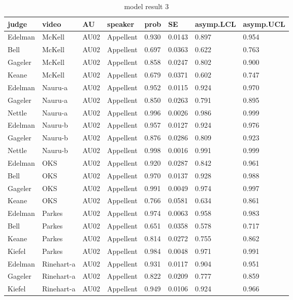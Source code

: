 \documentclass{monashthesis}
\begin{document}
\begin{center}
\begin{longtable}{llllllll}
\caption{\label{tab:result_3} model result 3}\\
\toprule
judge & video & AU & speaker & prob & SE & asymp.LCL & asymp.UCL \\
\midrule
\endhead
\bottomrule
\endfoot
Edelman & McKell & AU02 & Appellent & 0.930 & 0.0143 & 0.897 & 0.954 \\
Bell & McKell & AU02 & Appellent & 0.697 & 0.0363 & 0.622 & 0.763 \\
Gageler & McKell & AU02 & Appellent & 0.858 & 0.0247 & 0.802 & 0.900 \\
Keane & McKell & AU02 & Appellent & 0.679 & 0.0371 & 0.602 & 0.747 \\
Edelman & Nauru-a & AU02 & Appellent & 0.952 & 0.0115 & 0.924 & 0.970 \\
Gageler & Nauru-a & AU02 & Appellent & 0.850 & 0.0263 & 0.791 & 0.895 \\
Nettle & Nauru-a & AU02 & Appellent & 0.996 & 0.0026 & 0.986 & 0.999 \\
Edelman & Nauru-b & AU02 & Appellent & 0.957 & 0.0127 & 0.924 & 0.976 \\
Gageler & Nauru-b & AU02 & Appellent & 0.876 & 0.0286 & 0.809 & 0.923 \\
Nettle & Nauru-b & AU02 & Appellent & 0.998 & 0.0016 & 0.991 & 0.999 \\
Edelman & OKS & AU02 & Appellent & 0.920 & 0.0287 & 0.842 & 0.961 \\
Bell & OKS & AU02 & Appellent & 0.970 & 0.0137 & 0.928 & 0.988 \\
Gageler & OKS & AU02 & Appellent & 0.991 & 0.0049 & 0.974 & 0.997 \\
Keane & OKS & AU02 & Appellent & 0.766 & 0.0581 & 0.634 & 0.861 \\
Edelman & Parkes & AU02 & Appellent & 0.974 & 0.0063 & 0.958 & 0.983 \\
Bell & Parkes & AU02 & Appellent & 0.651 & 0.0358 & 0.578 & 0.717 \\
Keane & Parkes & AU02 & Appellent & 0.814 & 0.0272 & 0.755 & 0.862 \\
Kiefel & Parkes & AU02 & Appellent & 0.984 & 0.0048 & 0.971 & 0.991 \\
Edelman & Rinehart-a & AU02 & Appellent & 0.931 & 0.0117 & 0.904 & 0.951 \\
Gageler & Rinehart-a & AU02 & Appellent & 0.822 & 0.0209 & 0.777 & 0.859 \\
Kiefel & Rinehart-a & AU02 & Appellent & 0.949 & 0.0106 & 0.924 & 0.966 \\

\end{longtable}
\end{center}
\end{document}

